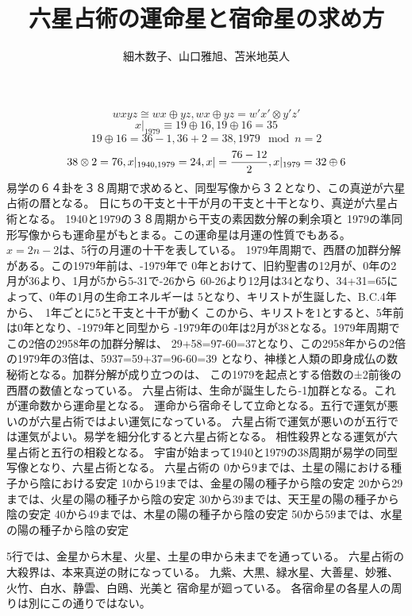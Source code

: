 ﻿\documentclass{jsarticle}
\begin{document}
\title{六星占術の運命星と宿命星の求め方}
\author{細木数子、山口雅旭、苫米地英人}
\date{}
\maketitle



  $$ wxyz \cong wx \oplus yz, wx \oplus yz = w'x' \otimes y'z' $$
  $$ x|_{1979} \equiv 19 \oplus 16, 19 \oplus 16 = 35 $$ 
  $$ 19 \oplus 16 = 36 - 1, 36 + 2 = 38, 1979 \mod n = 2 $$
  $$ 38 \otimes 2 = 76, x|_{1940,1979} = 24, x| = {76 - 12 \over 2}, x|_{1979} = 32 \oplus 6 $$
  易学の６４卦を３８周期で求めると、同型写像から３２となり、この真逆が六星占術の暦となる。
  日にちの干支と十干が月の干支と十干となり、真逆が六星占術となる。
  1940と1979の３８周期から干支の素因数分解の剰余項と
  1979の準同形写像からも運命星がもとまる。この運命星は月運の性質でもある。
  $ x = 2n - 2 $は、5行の月運の十干を表している。
  1979年周期で、西暦の加群分解がある。この1979年前は、-1979年で
  0年とおけて、旧約聖書の12月が、0年の2月が36より、1月が5から5-31で-26から
  60-26より12月は34となり、34+31=65によって、0年の1月の生命エネルギーは
  5となり、キリストが生誕した、B.C.4年から、　1年ごとに5と干支と十干が動く
  このから、キリストを1とすると、5年前は0年となり、-1979年と同型から
  -1979年の0年は2月が38となる。1979年周期でこの2倍の2958年の加群分解は、
  29+58=97-60=37となり、この2958年からの2倍の1979年の3倍は、5937=59+37=96-60=39
  となり、神様と人類の即身成仏の数秘術となる。加群分解が成り立つのは、
  この1979を起点とする倍数の±2前後の西暦の数値となっている。
  六星占術は、生命が誕生したら-1加群となる。これが運命数から運命星となる。
  運命から宿命そして立命となる。五行で運気が悪いのが六星占術ではよい運気になっている。
  六星占術で運気が悪いのが五行では運気がよい。易学を細分化すると六星占術となる。
  相性殺界となる運気が六星占術と五行の相殺となる。
  宇宙が始まって1940と1979の38周期が易学の同型写像となり、六星占術となる。
  六星占術の
  0から9までは、土星の陽における種子から陰における安定
  10から19までは、金星の陽の種子から陰の安定
  20から29までは、火星の陽の種子から陰の安定
  30から39までは、天王星の陽の種子から陰の安定
  40から49までは、木星の陽の種子から陰の安定
  50から59までは、水星の陽の種子から陰の安定


  5行では、金星から木星、火星、土星の申から未までを通っている。
  六星占術の大殺界は、本来真逆の財になっている。
  九紫、大黒、緑水星、大善星、妙雅、火竹、白水、静雲、白鴎、光美と
  宿命星が廻っている。
  各宿命星の各星人の周りは別にこの通りではない。　
\end{document}
